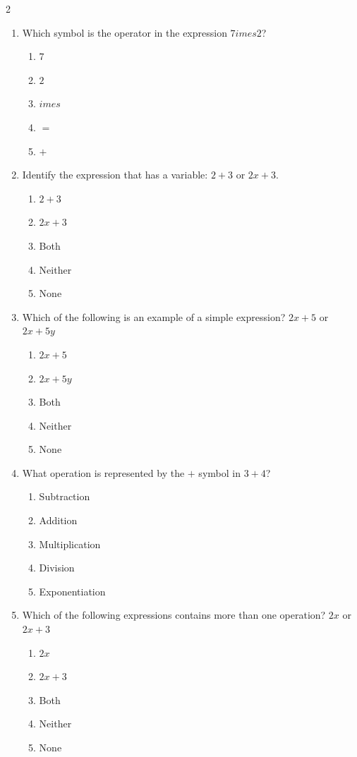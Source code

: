 \documentclass[10pt]{article}
\begin{document}
\begin{multicols}{2}
\begin{enumerate}[label=\textbf{Q\arabic*.}, leftmargin=*, itemsep=6pt, parsep=0pt]
  \item \small Which symbol is the operator in the expression $7 	imes 2$?
  \begin{enumerate}[label=(\Alph*), leftmargin=0.6cm, nosep, itemsep=2pt]
    \item $7$
    \item $2$
    \item $	imes$
    \item $=$
    \item $+$
  \end{enumerate}

  \item \small Identify the expression that has a variable: $2 + 3$ or $2x + 3$.
  \begin{enumerate}[label=(\Alph*), leftmargin=0.6cm, nosep, itemsep=2pt]
    \item $2 + 3$
    \item $2x + 3$
    \item Both
    \item Neither
    \item None
  \end{enumerate}

  \item \small Which of the following is an example of a simple expression? $2x + 5$ or $2x + 5y$
  \begin{enumerate}[label=(\Alph*), leftmargin=0.6cm, nosep, itemsep=2pt]
    \item $2x + 5$
    \item $2x + 5y$
    \item Both
    \item Neither
    \item None
  \end{enumerate}

  \item \small What operation is represented by the $+$ symbol in $3 + 4$?
  \begin{enumerate}[label=(\Alph*), leftmargin=0.6cm, nosep, itemsep=2pt]
    \item Subtraction
    \item Addition
    \item Multiplication
    \item Division
    \item Exponentiation
  \end{enumerate}

  \item \small Which of the following expressions contains more than one operation? $2x$ or $2x + 3$
  \begin{enumerate}[label=(\Alph*), leftmargin=0.6cm, nosep, itemsep=2pt]
    \item $2x$
    \item $2x + 3$
    \item Both
    \item Neither
    \item None
  \end{enumerate}

\end{enumerate}
\end{multicols}
\end{document}

